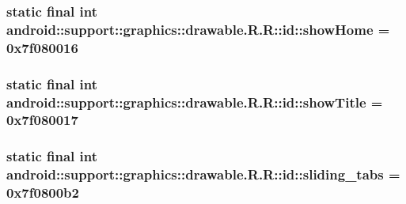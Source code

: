 \hypertarget{classandroid_1_1support_1_1graphics_1_1drawable_1_1_r_1_1id_4b2cb47cf4e0686858c56065e23026e9}{
\subsubsection[{showHome}]{\setlength{\rightskip}{0pt plus 5cm}static final int android::support::graphics::drawable.R.R::id::showHome = 0x7f080016}}
\label{classandroid_1_1support_1_1graphics_1_1drawable_1_1_r_1_1id_4b2cb47cf4e0686858c56065e23026e9}


\hypertarget{classandroid_1_1support_1_1graphics_1_1drawable_1_1_r_1_1id_d330c20e2cbc7a69ef1009bd802fc5a7}{
\subsubsection[{showTitle}]{\setlength{\rightskip}{0pt plus 5cm}static final int android::support::graphics::drawable.R.R::id::showTitle = 0x7f080017}}
\label{classandroid_1_1support_1_1graphics_1_1drawable_1_1_r_1_1id_d330c20e2cbc7a69ef1009bd802fc5a7}


\hypertarget{classandroid_1_1support_1_1graphics_1_1drawable_1_1_r_1_1id_c3a1b04e61ada814722d4cc67ed76909}{
\subsubsection[{sliding\_\-tabs}]{\setlength{\rightskip}{0pt plus 5cm}static final int android::support::graphics::drawable.R.R::id::sliding\_\-tabs = 0x7f0800b2}}
\label{classandroid_1_1support_1_1graphics_1_1drawable_1_1_r_1_1id_c3a1b04e61ada814722d4cc67ed76909}



